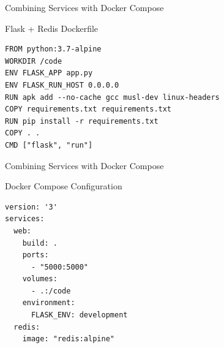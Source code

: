 \documentclass[10pt, compress, aspectratio=169, xcolor={table,usenames,dvipsnames}]{beamer}
\begin{document}
\begin{frame}[label={sec:org577e3c1},fragile]{Combining Services with Docker Compose}
 \begin{block}{Flask + Redis Dockerfile}
\lstset{language=dockerfile,label= ,caption= ,captionpos=b,numbers=none}
\begin{lstlisting}
FROM python:3.7-alpine
WORKDIR /code
ENV FLASK_APP app.py
ENV FLASK_RUN_HOST 0.0.0.0
RUN apk add --no-cache gcc musl-dev linux-headers
COPY requirements.txt requirements.txt
RUN pip install -r requirements.txt
COPY . .
CMD ["flask", "run"]
\end{lstlisting}
\end{block}
\end{frame}

\begin{frame}[label={sec:orgfeeec9d},fragile]{Combining Services with Docker Compose}
 \begin{block}{Docker Compose Configuration}
\lstset{language=yaml,label= ,caption= ,captionpos=b,numbers=none}
\begin{lstlisting}
version: '3'
services:
  web:
    build: .
    ports:
      - "5000:5000"
    volumes:
      - .:/code
    environment:
      FLASK_ENV: development
  redis:
    image: "redis:alpine"
\end{lstlisting}
\end{block}
\end{frame}
\end{document}
